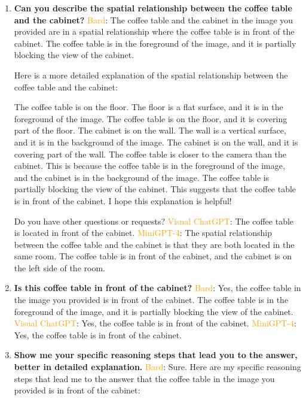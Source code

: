 \begin{enumerate}
    \item \textbf{Can you describe the spatial relationship between the coffee table and the cabinet?}
    \subitem \textcolor{orange}{Bard}: 
    The coffee table and the cabinet in the image you provided are in a spatial relationship where the coffee table is in front of the cabinet. The coffee table is in the foreground of the image, and it is partially blocking the view of the cabinet.

    Here is a more detailed explanation of the spatial relationship between the coffee table and the cabinet:

    The coffee table is on the floor. The floor is a flat surface, and it is in the foreground of the image. The coffee table is on the floor, and it is covering part of the floor.
    The cabinet is on the wall. The wall is a vertical surface, and it is in the background of the image. The cabinet is on the wall, and it is covering part of the wall.
    The coffee table is closer to the camera than the cabinet. This is because the coffee table is in the foreground of the image, and the cabinet is in the background of the image.
    The coffee table is partially blocking the view of the cabinet. This suggests that the coffee table is in front of the cabinet.
    I hope this explanation is helpful!

    Do you have other questions or requests?
    \subitem \textcolor{orange}{Visual ChatGPT}: The coffee table is located in front of the cabinet.
    \subitem \textcolor{orange}{MiniGPT-4}: The spatial relationship between the coffee table and the cabinet is that they are both located in the same room. The coffee table is in front of the cabinet, and the cabinet is on the left side of the room.
    \item \textbf{Is this coffee table in front of the cabinet?}
    \subitem \textcolor{orange}{Bard}: 
    Yes, the coffee table in the image you provided is in front of the cabinet. The coffee table is in the foreground of the image, and it is partially blocking the view of the cabinet.
    \subitem \textcolor{orange}{Visual ChatGPT}: Yes, the coffee table is in front of the cabinet.
    \subitem \textcolor{orange}{MiniGPT-4}: Yes, the coffee table is in front of the cabinet.
    \item \textbf{Show me your specific reasoning steps that lead you to the answer, better in detailed explanation.}
    \subitem \textcolor{orange}{Bard}: Sure. Here are my specific reasoning steps that lead me to the answer that the coffee table in the image you provided is in front of the cabinet:


\end{enumerate}
